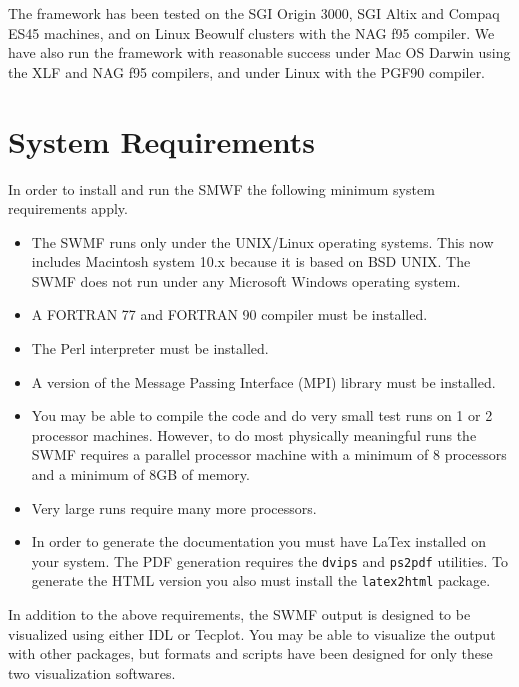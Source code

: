The framework has been tested on the SGI Origin 3000, SGI Altix and 
Compaq ES45 machines, and on Linux Beowulf clusters with the NAG f95 
compiler. We have also run the framework with reasonable success under
Mac OS Darwin using the XLF and NAG f95 compilers, and under Linux with
the PGF90 compiler.

\section{System Requirements}

In order to install and run the SMWF the following minimum system
requirements apply.

\begin{itemize}
\item The SWMF runs only under the UNIX/Linux operating systems.  This now
  includes Macintosh system 10.x because it is based on BSD UNIX.  The
  SWMF does not run under any Microsoft Windows operating system.
\item A FORTRAN 77 and FORTRAN 90 compiler must be installed.
\item The Perl interpreter must be installed.
\item A version of the Message Passing Interface (MPI) library must be
  installed.
\item You may be able to compile the code and do very small test
runs on 1 or 2 processor machines.  However, to do most physically
meaningful runs the SWMF requires a
parallel processor machine with a minimum of 8 processors and a minimum of 8GB of
memory.
\item Very large runs require many more processors.
\item In order to generate the documentation you must have LaTex installed on
your system.  The PDF generation requires the {\tt dvips} and {\tt ps2pdf}
utilities.  To generate the HTML version you also must install the
{\tt latex2html} package. 

\end{itemize}


In addition to the above requirements, the SWMF output is designed to
be visualized using either IDL or Tecplot.  You may be able to
visualize the output with other packages, but formats and scripts have
been designed for only these two visualization softwares.





